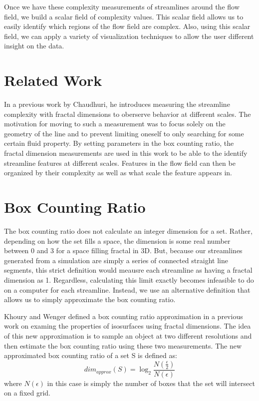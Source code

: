 \documentclass[journal]{vgtc}                %
\begin{document}
Once we have these complexity measurements of streamlines around the flow field, we build a scalar field of complexity values.
This scalar field allows us to easily identify which regions of the flow field are complex.
Also, using this scalar field, we can apply a variety of visualization techniques to allow the user different insight on the data.

\section{Related Work}

In a previous work by Chaudhuri, he introduces measuring the streamline complexity with fractal dimensions to oberserve behavior at different scales.
The motivation for moving to such a measurement was to focus solely on the geometry of the line and to prevent limiting oneself to only searching for some certain fluid property.
By setting parameters in the box counting ratio, the fractal dimension measurements are used in this work to be able to the identify streamline features at different scales.
Features in the flow field can then be organized by their complexity as well as what scale the feature appears in.

\section{Box Counting Ratio}

The box counting ratio does not calculate an integer dimension for a set.
Rather, depending on how the set fills a space, the dimension is some real number between 0 and 3 for a space filling fractal in 3D.
But, because our streamlines generated from a simulation are simply a series of connected straight line segments, this strict definition would meausre each streamline as having a fractal dimension as 1.
Regardless, calculating this limit exactly becomes infeasible to do on a computer for each streamline.
Instead, we use an alternative definition that allows us to simply approximate the box counting ratio.

Khoury and Wenger defined a box counting ratio approximation in a previous work on examing the properties of isosurfaces using fractal dimensions.
The idea of this new approximation is to sample an object at two different resolutions and then estimate the box counting ratio using these two measurements.
The new approximated box counting ratio of a set S is defined as:
\begin{equation} dim_{approx}(S) = \log_2\frac{N(\frac{\epsilon}{2})}{N(\epsilon)}\end{equation}
where $N(\epsilon)$ in this case is simply the number of boxes that the set will intersect on a fixed grid.
\end{document}
